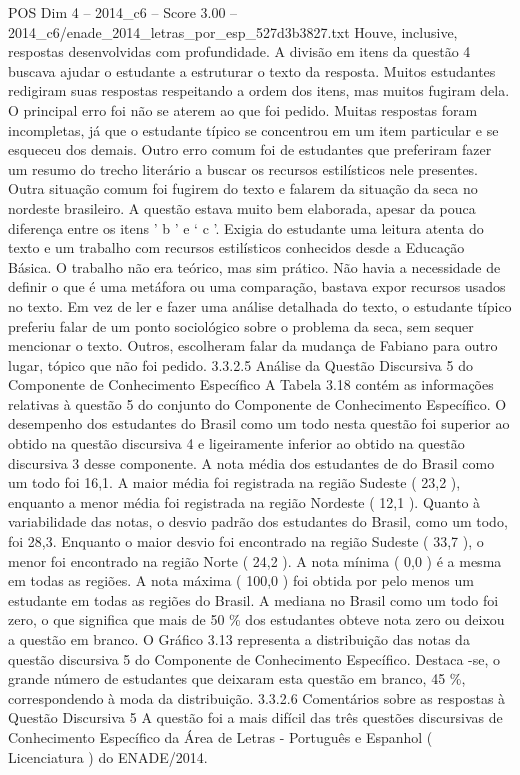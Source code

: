 \begin{textsample}{POS Dim 4 – 2014\_c6 – Score 3.00 – 2014\_c6/enade\_2014\_letras\_por\_esp\_527d3b3827.txt}
Houve, inclusive, respostas desenvolvidas com profundidade.
A divisão em itens da questão 4 buscava ajudar o estudante a estruturar o texto da resposta.
Muitos estudantes redigiram suas respostas respeitando a ordem dos itens, mas muitos fugiram dela.
O principal erro foi não se aterem ao que foi pedido.
Muitas respostas foram incompletas, já que o estudante típico se concentrou em um item particular e se esqueceu dos demais.
Outro erro comum foi de estudantes que preferiram fazer um resumo do trecho literário a buscar os recursos estilísticos nele presentes.
Outra situação comum foi fugirem do texto e falarem da situação da seca no nordeste brasileiro.
A questão estava muito bem elaborada, apesar da pouca diferença entre os itens ’ b ’ e ‘ c ’.
Exigia do estudante uma leitura atenta do texto e um trabalho com recursos estilísticos conhecidos desde a Educação Básica.
O trabalho não era teórico, mas sim prático.
Não havia a necessidade de definir o que é uma metáfora ou uma comparação, bastava expor recursos usados no texto.
Em vez de ler e fazer uma análise detalhada do texto, o estudante típico preferiu falar de um ponto sociológico sobre o problema da seca, sem sequer mencionar o texto.
Outros, escolheram falar da mudança de Fabiano para outro lugar, tópico que não foi pedido. 3.3.2.5 Análise da Questão Discursiva 5 do Componente de Conhecimento Específico A Tabela 3.18 contém as informações relativas à questão 5 do conjunto do Componente de Conhecimento Específico.
O desempenho dos estudantes do Brasil como um todo nesta questão foi superior ao obtido na questão discursiva 4 e ligeiramente inferior ao obtido na questão discursiva 3 desse componente.
A nota média dos estudantes de do Brasil como um todo foi 16,1.
A maior média foi registrada na região Sudeste ( 23,2 ), enquanto a menor média foi registrada na região Nordeste ( 12,1 ).
Quanto à variabilidade das notas, o desvio padrão dos estudantes do Brasil, como um todo, foi 28,3.
Enquanto o maior desvio foi encontrado na região Sudeste ( 33,7 ), o menor foi encontrado na região Norte ( 24,2 ).
A nota mínima ( 0,0 ) é a mesma em todas as regiões.
A nota máxima ( 100,0 ) foi obtida por pelo menos um estudante em todas as regiões do Brasil.
A mediana no Brasil como um todo foi zero, o que significa que mais de 50 \% dos estudantes obteve nota zero ou deixou a questão em branco.
O Gráfico 3.13 representa a distribuição das notas da questão discursiva 5 do Componente de Conhecimento Específico.
Destaca -se, o grande número de estudantes que deixaram esta questão em branco, 45 \%, correspondendo à moda da distribuição. 3.3.2.6 Comentários sobre as respostas à Questão Discursiva 5 A questão foi a mais difícil das três questões discursivas de Conhecimento Específico da Área de Letras - Português e Espanhol ( Licenciatura ) do ENADE/2014.

\end{textsample}
